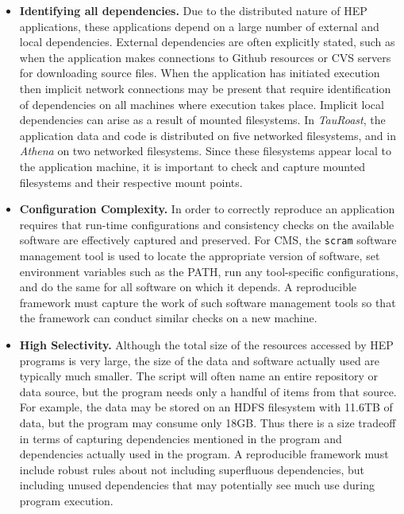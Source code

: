 \begin{itemize}

\item {\bf Identifying all dependencies.}  Due to the distributed nature of HEP applications, these applications depend on a large number of external and local dependencies.
External dependencies are often explicitly stated, such as when the application makes connections to Github resources or CVS servers for downloading source files. 
When the application has initiated execution then implicit network connections may be present that require identification of dependencies on all machines where execution takes place. 
Implicit local dependencies can arise as a result of mounted filesystems. In \emph{TauRoast}, the application data and code is distributed on five networked filesystems, and in \emph{Athena} on two networked filesystems. 
Since these filesystems appear local to the application machine, it is important to check and capture mounted filesystems and their respective mount points. 

\item {\bf Configuration Complexity.} In order to correctly reproduce an application requires that run-time configurations and consistency checks on the available software are effectively captured and preserved. 
For CMS,  the {\tt scram} software management tool is used to locate
the appropriate version of software,  set environment variables such as the PATH, run any
tool-specific configurations, and do the same for all software on which it depends. A reproducible framework must capture the work of such software management tools so that the framework can conduct similar checks on a new machine. 

\item {\bf High Selectivity.}  
Although the total size of the resources accessed by HEP programs is very large, the size of the data and software actually used are typically much smaller. The script will often name an entire repository or data source, but the program needs only a handful of items from that source. For example, the data may be stored on an HDFS filesystem with 11.6TB of data, but the program may consume only 18GB. Thus there is a size tradeoff in terms of capturing dependencies mentioned in the program and dependencies actually used in the program. A reproducible framework must include robust rules about not including superfluous dependencies, but including unused dependencies that may potentially see much use during program execution.


\end{itemize}
